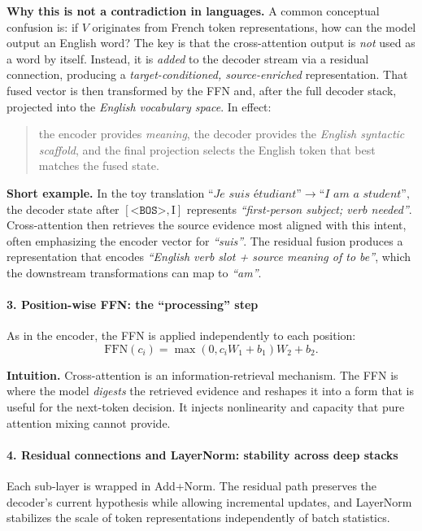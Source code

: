 \noindent
\textbf{Why this is not a contradiction in languages.}
A common conceptual confusion is:
if \(V\) originates from French token representations,
how can the model output an English word?
The key is that the cross-attention output is \emph{not} used as a word by itself.
Instead, it is \emph{added} to the decoder stream via a residual connection,
producing a \emph{target-conditioned, source-enriched} representation.
That fused vector is then transformed by the FFN and, after the full decoder stack,
projected into the \emph{English vocabulary space}.
In effect:
\begin{quote}
	the encoder provides \emph{meaning},
	the decoder provides the \emph{English syntactic scaffold},
	and the final projection selects the English token that best matches the fused state.
\end{quote}

\newpage

\textbf{Short example.}
In the toy translation
\(
\textit{``Je suis \'{e}tudiant''} \rightarrow \textit{``I am a student''},
\)
the decoder state after \([\texttt{<BOS>}, \text{I}]\)
represents \emph{``first-person subject; verb needed''}.
Cross-attention then retrieves the source evidence most aligned with this intent,
often emphasizing the encoder vector for \emph{``suis''}.
The residual fusion produces a representation that encodes
\emph{``English verb slot + source meaning of \textit{to be}''},
which the downstream transformations can map to \emph{``am''}.

\paragraph{3. Position-wise FFN: the ``processing'' step}
\noindent
As in the encoder, the FFN is applied independently to each position:
\[
\text{FFN}(c_i)
=
\max(0, c_iW_1 + b_1)W_2 + b_2.
\]

\noindent
\textbf{Intuition.}
Cross-attention is an information-retrieval mechanism.
The FFN is where the model \emph{digests} the retrieved evidence
and reshapes it into a form that is useful for the next-token decision.
It injects nonlinearity and capacity that pure attention mixing cannot provide.

\paragraph{4. Residual connections and LayerNorm: stability across deep stacks}
\noindent
Each sub-layer is wrapped in Add+Norm.
The residual path preserves the decoder's current hypothesis while allowing incremental updates,
and LayerNorm stabilizes the scale of token representations independently of batch statistics.

